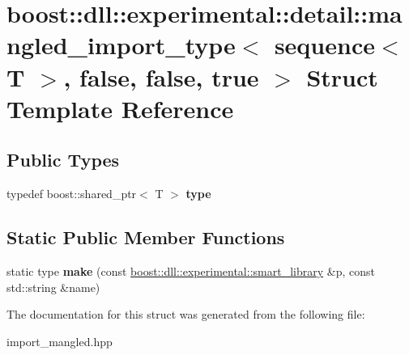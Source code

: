 \hypertarget{a00209}{}\section{boost\+:\+:dll\+:\+:experimental\+:\+:detail\+:\+:mangled\+\_\+import\+\_\+type$<$ sequence$<$ T $>$, false, false, true $>$ Struct Template Reference}
\label{a00209}
\subsection*{Public Types}
\begin{DoxyCompactItemize}
\item 
typedef boost\+::shared\+\_\+ptr$<$ T $>$ {\bfseries type}\hypertarget{a00209_ade212675474fedf00b10222d999e9d6a}{}\label{a00209_ade212675474fedf00b10222d999e9d6a}

\end{DoxyCompactItemize}
\subsection*{Static Public Member Functions}
\begin{DoxyCompactItemize}
\item 
static type {\bfseries make} (const \hyperlink{a00281}{boost\+::dll\+::experimental\+::smart\+\_\+library} \&p, const std\+::string \&name)\hypertarget{a00209_aba231392f132614d763cb0997c53cbcd}{}\label{a00209_aba231392f132614d763cb0997c53cbcd}

\end{DoxyCompactItemize}


The documentation for this struct was generated from the following file\+:\begin{DoxyCompactItemize}
\item 
import\+\_\+mangled.\+hpp\end{DoxyCompactItemize}
